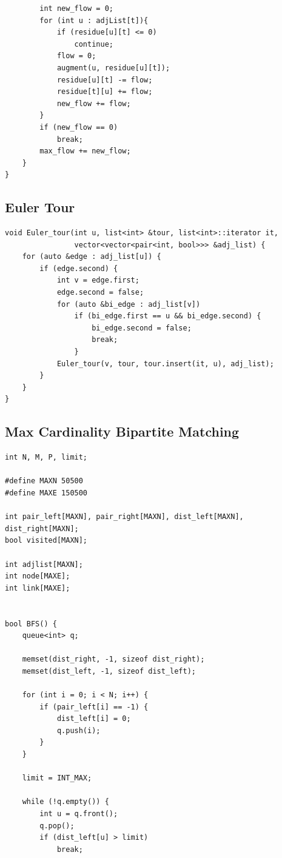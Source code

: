 \documentclass[10pt,landscape]{article}
\begin{document}
\begin{multicols}{2}
\begin{lstlisting}
        int new_flow = 0;
        for (int u : adjList[t]){
            if (residue[u][t] <= 0)
                continue;
            flow = 0;
            augment(u, residue[u][t]);
            residue[u][t] -= flow;
            residue[t][u] += flow;
            new_flow += flow;
        }
        if (new_flow == 0)
            break;
        max_flow += new_flow; 
    }
}
\end{lstlisting}

\subsection{Euler Tour}
\begin{lstlisting}
void Euler_tour(int u, list<int> &tour, list<int>::iterator it, 
                vector<vector<pair<int, bool>>> &adj_list) {
    for (auto &edge : adj_list[u]) {
        if (edge.second) {
            int v = edge.first;
            edge.second = false;
            for (auto &bi_edge : adj_list[v]) 
                if (bi_edge.first == u && bi_edge.second) {
                    bi_edge.second = false;
                    break;
                }
            Euler_tour(v, tour, tour.insert(it, u), adj_list);
        }
    }
}
\end{lstlisting}

\subsection{Max Cardinality Bipartite Matching}
\begin{lstlisting}
int N, M, P, limit;

#define MAXN 50500
#define MAXE 150500
 
int pair_left[MAXN], pair_right[MAXN], dist_left[MAXN], dist_right[MAXN];
bool visited[MAXN];

int adjlist[MAXN];
int node[MAXE];
int link[MAXE];

 
bool BFS() {
    queue<int> q;
 
    memset(dist_right, -1, sizeof dist_right);
    memset(dist_left, -1, sizeof dist_left);
 
    for (int i = 0; i < N; i++) {
        if (pair_left[i] == -1) {
            dist_left[i] = 0;
            q.push(i);
        }
    }
 
    limit = INT_MAX;
 
    while (!q.empty()) {
        int u = q.front();
        q.pop();
        if (dist_left[u] > limit)
            break;
 

\end{lstlisting}
\end{multicols}
\end{document}
